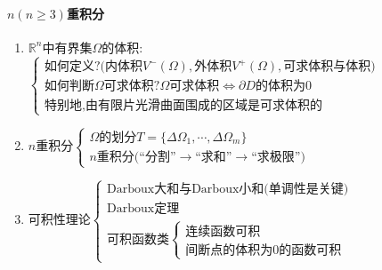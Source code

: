 \documentclass[UTF8]{ctexart}
\newcommand{\x}{\boldsymbol{x}}
\begin{document}
    \paragraph{$n(n\ge 3)$重积分}
    \begin{enumerate}
        \item $\mathbb{R}^n$中有界集$\Omega$的体积:$\begin{cases}
            \text{如何定义?(内体积}V^-(\Omega),\text{外体积}V^+(\Omega),\text{可求体积与体积)}\\
            \text{如何判断}\Omega\text{可求体积?}\Omega\text{可求体积$\Leftrightarrow\partial D$的体积为0}\\
            \text{特别地,由有限片光滑曲面围成的区域是可求体积的}
        \end{cases}$
        \item $n$重积分$\begin{cases}
            \Omega\text{的划分}T=\{\Delta\Omega_1,\cdots,\Delta\Omega_m\}\\
            n\text{重积分(``分割''$\rightarrow$``求和''$\rightarrow$``求极限'')}
        \end{cases}$
        \item 可积性理论$\begin{cases}
            \text{Darboux大和与Darboux小和(单调性是关键)}\\
            \text{Darboux定理}\\
            \text{可积函数类}\begin{cases}
                \text{连续函数可积}\\
                \text{间断点的体积为0的函数可积}
            \end{cases}
        \end{cases}$
    \end{enumerate}
\end{document}
